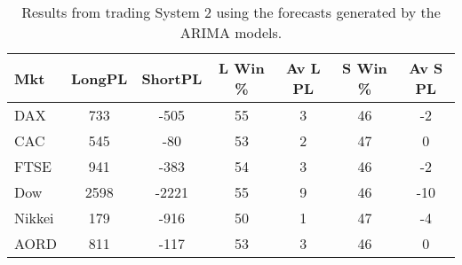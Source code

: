 \begin{table}[ht]
\centering
\caption[Results from trading System 2 using the forecasts generated by the ARIMA models]{Results from trading System 2 using the forecasts generated by the ARIMA models.} 
\label{tab:chp_ts:arima2}
\begin{tabular}{lcccccc}
  \toprule Mkt & LongPL & ShortPL & L Win \% & Av L PL & S Win \% & Av S PL \\ 
  \midrule DAX & 733 & -505 & 55 & 3 & 46 & -2 \\ 
  CAC & 545 & -80 & 53 & 2 & 47 & 0 \\ 
  FTSE & 941 & -383 & 54 & 3 & 46 & -2 \\ 
  Dow & 2598 & -2221 & 55 & 9 & 46 & -10 \\ 
  Nikkei & 179 & -916 & 50 & 1 & 47 & -4 \\ 
  AORD & 811 & -117 & 53 & 3 & 46 & 0 \\ 
   \bottomrule \end{tabular}
\end{table}
